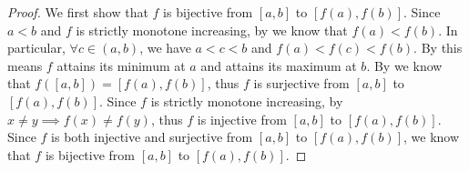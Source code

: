 \begin{proof}
  We first show that \(f\) is bijective from \([a, b]\) to \([f(a), f(b)]\).
  Since \(a < b\) and \(f\) is strictly monotone increasing, by  we know that \(f(a) < f(b)\).
  In particular, \(\forall c \in (a, b)\), we have \(a < c < b\) and \(f(a) < f(c) < f(b)\).
  By  this means \(f\) attains its minimum at \(a\) and attains its maximum at \(b\).
  By  we know that \(f([a, b]) = [f(a), f(b)]\), thus \(f\) is surjective from \([a, b]\) to \([f(a), f(b)]\).
  Since \(f\) is strictly monotone increasing, by  \(x \neq y \implies f(x) \neq f(y)\), thus \(f\) is injective from \([a, b]\) to \([f(a), f(b)]\).
  Since \(f\) is both injective and surjective from \([a, b]\) to \([f(a), f(b)]\), we know that \(f\) is bijective from \([a, b]\) to \([f(a), f(b)]\).


\end{proof}
